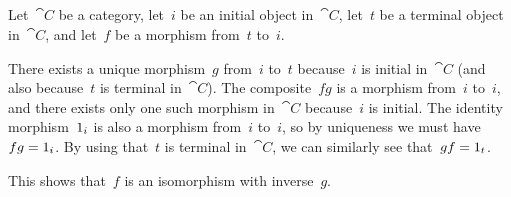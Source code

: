 \subsection{}

Let~$\cat{C}$ be a category, let~$i$ be an initial object in~$\cat{C}$, let~$t$ be a terminal object in~$\cat{C}$, and let~$f$ be a morphism from~$t$ to~$i$.

There exists a unique morphism~$g$ from~$i$ to~$t$ because~$i$ is initial in~$\cat{C}$ (and also because~$t$ is terminal in~$\cat{C}$).
The composite~$f g$ is a morphism from~$i$ to~$i$, and there exists only one such morphism in~$\cat{C}$ because~$i$ is initial.
The identity morphism~$1_i$ is also a morphism from~$i$ to~$i$, so by uniqueness we must have~$f g = 1_i$.
By using that~$t$ is terminal in~$\cat{C}$, we can similarly see that~$g f = 1_t$.

This shows that~$f$ is an isomorphism with inverse~$g$.
